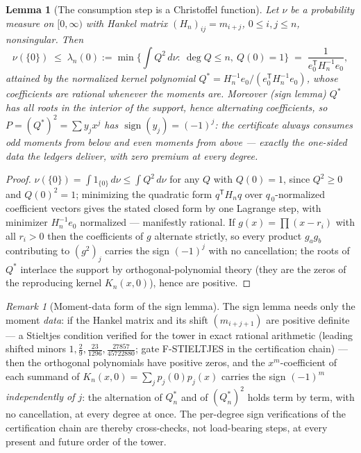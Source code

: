 \documentclass[11pt]{article}
\numberwithin{equation}{section}
\newtheorem{lemma}[theorem]{Lemma}
\theoremstyle{definition}
\theoremstyle{remark}
\newtheorem{remark}[theorem]{Remark}
\begin{document}
\begin{lemma}[The consumption step is a Christoffel
function]\label{l:christoffel}
Let $\nu$ be a probability measure on $[0,\infty)$ with
Hankel matrix $(H_n)_{ij}=m_{i+j}$, $0\le i,j\le n$,
nonsingular. Then
\[
\nu(\{0\})\;\le\;\lambda_n(0)
:=\min\{\textstyle\int Q^2\,d\nu:\ \deg Q\le n,\ Q(0)=1\}
\;=\;\frac1{e_0^{\mathsf T}H_n^{-1}e_0},
\]
attained by the normalized kernel polynomial
$Q^*=H_n^{-1}e_0/(e_0^{\mathsf T}H_n^{-1}e_0)$, whose
coefficients are \emph{rational} whenever the moments are.
Moreover (sign lemma) $Q^*$ has all roots in the interior of
the support, hence alternating coefficients, so
$P=(Q^*)^2=\sum y_jx^j$ has $\operatorname{sign}(y_j)=(-1)^j$:
the certificate always consumes odd moments from below and
even moments from above --- exactly the one-sided data the
ledgers deliver, with zero premium at every degree.
\end{lemma}

\begin{proof}
$\nu(\{0\})=\int1_{\{0\}}\,d\nu\le\int Q^2\,d\nu$ for any $Q$
with $Q(0)=1$, since $Q^2\ge0$ and $Q(0)^2=1$; minimizing the
quadratic form $q^{\mathsf T}H_nq$ over $q_{\,0}$-normalized
coefficient vectors gives the stated closed form by one
Lagrange step, with minimizer $H_n^{-1}e_0$ normalized ---
manifestly rational. If $g(x)=\prod(x-r_i)$ with all $r_i>0$
then the coefficients of $g$ alternate strictly, so every
product $g_ag_b$ contributing to $(g^2)_j$ carries the sign
$(-1)^j$ with no cancellation; the roots of $Q^*$ interlace
the support by orthogonal-polynomial theory (they are the
zeros of the reproducing kernel $K_n(x,0)$), hence are
positive.
\end{proof}

\begin{remark}[Moment-data form of the sign
lemma]\label{r:stieltjes}
The sign lemma needs only the moment \emph{data}: if the
Hankel matrix and its shift $(m_{i+j+1})$ are positive
definite --- a Stieltjes condition verified for the tower in
exact rational arithmetic (leading shifted minors
$1,\tfrac29,\tfrac{23}{1296},\tfrac{27857}{45722880}$; gate
F-STIELTJES in the certification chain) --- then the
orthogonal polynomials have positive zeros, and the
$x^m$-coefficient of each summand of
$K_n(x,0)=\sum_jp_j(0)p_j(x)$ carries the sign $(-1)^m$
\emph{independently of $j$}: the alternation of $Q_n^*$ and of
$(Q_n^*)^2$ holds term by term, with no cancellation, at every
degree at once. The per-degree sign verifications of the
certification chain are thereby cross-checks, not load-bearing
steps, at every present and future order of the tower.
\end{remark}
\end{document}
